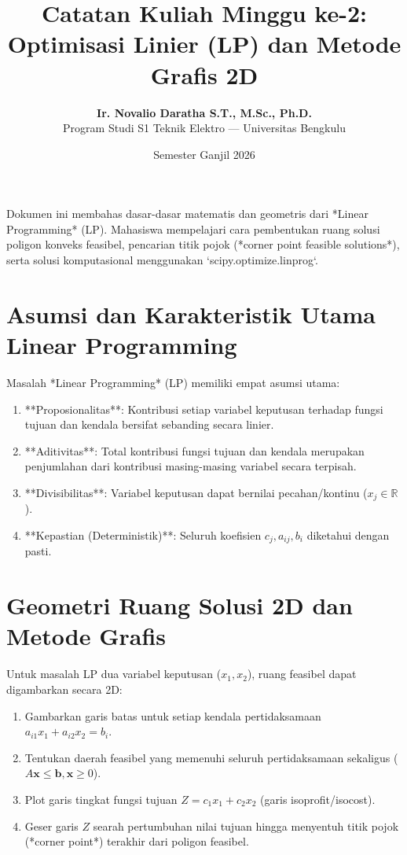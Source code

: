 \documentclass[11pt,a4paper]{article}
\title{\textbf{Catatan Kuliah Minggu ke-2:}\\Optimisasi Linier (LP) dan Metode Grafis 2D}
\author{\textbf{Ir. Novalio Daratha S.T., M.Sc., Ph.D.}\\Program Studi S1 Teknik Elektro --- Universitas Bengkulu}
\date{Semester Ganjil 2026}
\newcommand{\R}{\mathbb{R}}
\begin{document}
\maketitle

\begin{tcolorbox}[colback=unibblue!5,colframe=unibblue,title=\textbf{Ringkasan Eksekutif Pertemuan ke-2}]
Dokumen ini membahas dasar-dasar matematis dan geometris dari *Linear Programming* (LP). Mahasiswa mempelajari cara pembentukan ruang solusi poligon konveks feasibel, pencarian titik pojok (*corner point feasible solutions*), serta solusi komputasional menggunakan `scipy.optimize.linprog`.
\end{tcolorbox}

\tableofcontents
\newpage

\section{Asumsi dan Karakteristik Utama Linear Programming}
Masalah *Linear Programming* (LP) memiliki empat asumsi utama:
\begin{enumerate}
    \item **Proposionalitas**: Kontribusi setiap variabel keputusan terhadap fungsi tujuan dan kendala bersifat sebanding secara linier.
    \item **Aditivitas**: Total kontribusi fungsi tujuan dan kendala merupakan penjumlahan dari kontribusi masing-masing variabel secara terpisah.
    \item **Divisibilitas**: Variabel keputusan dapat bernilai pecahan/kontinu ($x_j \in \R$).
    \item **Kepastian (Deterministik)**: Seluruh koefisien $c_j, a_{ij}, b_i$ diketahui dengan pasti.
\end{enumerate}

\section{Geometri Ruang Solusi 2D dan Metode Grafis}
Untuk masalah LP dua variabel keputusan ($x_1, x_2$), ruang feasibel dapat digambarkan secara 2D:
\begin{enumerate}
    \item Gambarkan garis batas untuk setiap kendala pertidaksamaan $a_{i1} x_1 + a_{i2} x_2 = b_i$.
    \item Tentukan daerah feasibel yang memenuhi seluruh pertidaksamaan sekaligus ($A \mathbf{x} \le \mathbf{b}, \mathbf{x} \ge 0$).
    \item Plot garis tingkat fungsi tujuan $Z = c_1 x_1 + c_2 x_2$ (garis isoprofit/isocost).
    \item Geser garis $Z$ searah pertumbuhan nilai tujuan hingga menyentuh titik pojok (*corner point*) terakhir dari poligon feasibel.
\end{enumerate}
\end{document}
